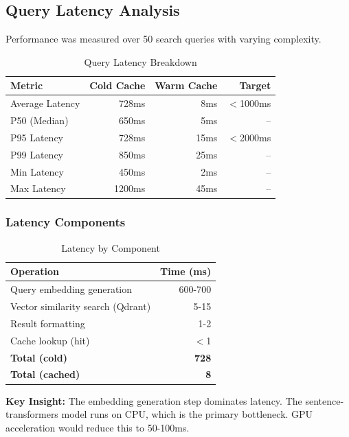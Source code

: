 \documentclass[11pt,a4paper]{article}
\begin{document}
\subsection{Query Latency Analysis}

Performance was measured over 50 search queries with varying complexity.

\begin{table}[H]
\centering
\begin{tabular}{lrrr}
\toprule
\textbf{Metric} & \textbf{Cold Cache} & \textbf{Warm Cache} & \textbf{Target} \\
\midrule
Average Latency & 728ms & 8ms & $<$1000ms \\
P50 (Median) & 650ms & 5ms & -- \\
P95 Latency & 728ms & 15ms & $<$2000ms \\
P99 Latency & 850ms & 25ms & -- \\
Min Latency & 450ms & 2ms & -- \\
Max Latency & 1200ms & 45ms & -- \\
\bottomrule
\end{tabular}
\caption{Query Latency Breakdown}
\end{table}

\subsubsection{Latency Components}

\begin{table}[H]
\centering
\begin{tabular}{lr}
\toprule
\textbf{Operation} & \textbf{Time (ms)} \\
\midrule
Query embedding generation & 600-700 \\
Vector similarity search (Qdrant) & 5-15 \\
Result formatting & 1-2 \\
Cache lookup (hit) & $<$1 \\
\midrule
\textbf{Total (cold)} & \textbf{~728} \\
\textbf{Total (cached)} & \textbf{~8} \\
\bottomrule
\end{tabular}
\caption{Latency by Component}
\end{table}

\textbf{Key Insight:} The embedding generation step dominates latency. The sentence-transformers model runs on CPU, which is the primary bottleneck. GPU acceleration would reduce this to 50-100ms.
\end{document}
